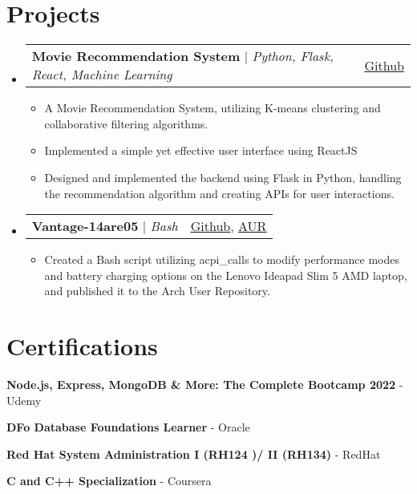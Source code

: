 \documentclass[a4paper,11pt]{article}
\makeatletter
\newcommand{\resumeItem}[1]{
    \item\small{
        {#1 \vspace{-4pt}}
    }
}
\newcommand{\resumeProjectHeading}[2]{
    \item
    \begin{tabular*}{0.97\textwidth}{l@{\extracolsep{\fill}}r}
        \small#1 & #2 \\
    \end{tabular*}\vspace{-7pt}
}
\newcommand{\resumeSubHeadingListStart}{\begin{itemize}[leftmargin=0.15in, label={}]}
\newcommand{\resumeSubHeadingListEnd}{\end{itemize}}
\newcommand{\resumeItemListStart}{\begin{itemize}}
\newcommand{\resumeItemListEnd}{\end{itemize}\vspace{-5pt}}
\makeatother
\begin{document}
\section{Projects}
\resumeSubHeadingListStart
\resumeProjectHeading
{\textbf{Movie Recommendation System} $|$ \emph{Python, Flask, React, Machine Learning}}{\href{https://github.com/ayushjaipuriyar/movie-recommendation-engine}{\underline{Github}}}
\resumeItemListStart
\resumeItem {A Movie Recommendation System, utilizing K-means clustering and collaborative filtering algorithms.}
\resumeItem {Implemented a simple yet effective user interface using ReactJS}
\resumeItem {Designed and implemented the backend using Flask in Python, handling the recommendation algorithm and creating APIs for user interactions.}
\resumeItemListEnd
\resumeProjectHeading
{\textbf{Vantage-14are05} $|$ \emph{Bash}}
{
	\href{https://github.com/ayushjaipuriyar/vantage-14are05}{\underline{Github}},
	\href{https://aur.archlinux.org/packages/vantage-14are05-git}{\underline{AUR}}
}
\resumeItemListStart
\resumeItem {Created a Bash script utilizing acpi\_calls to modify performance modes and battery charging options on the Lenovo Ideapad Slim 5 AMD laptop, and published it to the Arch User Repository.}
\resumeItemListEnd

\resumeSubHeadingListEnd




\section{Certifications}
\begin{itemize}[leftmargin=0.15in, label={},itemsep=0pt,parsep=0pt]
	\small{
	\item{
	      \textbf{Node.js, Express, MongoDB \& More: The Complete Bootcamp 2022}{ - Udemy}}
	\item{
	      \textbf{DFo Database Foundations Learner}{ - Oracle}
	      }
	\item{
	      \textbf{Red Hat System Administration I (RH124 )/ II (RH134)}{ - RedHat}
	      }
	\item {
	      \textbf{C and C++ Specialization}{ - Coursera}
	      }
	      }
\end{itemize}
\end{document}
